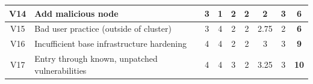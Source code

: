 \begin{landscape}
\begin{table}[]
{\begin{tabular}{|c|l|cccc|cc|c|}
V14             & Add malicious node                                                                     & 3                                        & 1                              & 2                                        & 2                    & 2                                      & 3            & \textbf{6}           \\ \hline
V15             & Bad user practice (outside of cluster)                                                 & 3                                        & 4                              & 2                                        & 2                    & 2.75                                   & 2            & \textbf{6}           \\ \hline
V16             & Incufficient base infrastructure hardening                                             & 4                                        & 4                              & 2                                        & 2                    & 3                                      & 3            & \textbf{9}           \\ \hline
V17             & Entry through known, unpatched vulnerabilities                                         & 4                                        & 4                              & 3                                        & 2                    & 3.25                                   & 3            & \textbf{10}          \\ \hline
\end{tabular}%
}
\end{table}
\end{landscape}


